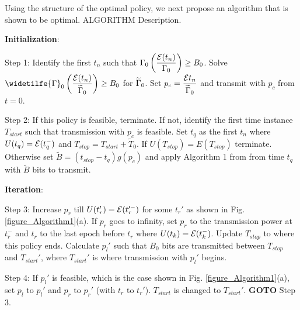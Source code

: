 
%

Using the structure of the optimal policy, we next propose an algorithm that is shown to be optimal. 
ALGORITHM Description.

\textbf{Initialization}:

Step 1: Identify the first $t_n$ such that $\Gamma_0\left(\dfrac{\mathcal{E}(t_n)}{\Gamma_0}\right)\ge B_0$. Solve $\widetilfe{\TRx}_0\left(\dfrac{\ETx(t_n)}{\widetilde{\TRx}_0}\right)\ge B_0$ for $\widetilde{\Gamma}_0$. Set $p_c = \dfrac{\mathcal{E}{t_n}}{\widetilde{\Gamma}_0}$ and transmit with $p_c$ from $t = 0$.

Step 2: If this policy is feasible, terminate. If not, identify the first time instance $T_{start}$ such that transmission with $p_c$ is feasible. Set $t_q$ as the first $t_n$ where $U(t_q) = \mathcal{E}(t_q^-)$ and $T_{stop} = T_{start} + \widetilde{T}_0$. If $U(T_{stop}) = E(T_{stop})$ terminate. Otherwise set $\widetilde{B} = (t_{stop} - t_q)g(p_c)$ and apply Algorithm 1 from \cite{Yang} from time $t_q$ with $\widetilde{B}$ bits to transmit.  

\textbf{Iteration}:

Step 3: Increase $p_r$ till $U(t_r') = \mathcal{E}(t_r'^-)$ for some $t_r'$ as shown in Fig. \ref{figure_Algorithm1}(a). If $p_r$ goes to infinity, set $p_r$ to the transmission power at $t_r^-$ and $t_r$ to the last epoch before $t_r$ where $U(t_k) = \mathcal{E}(t_k^-)$. Update $T_{stop}$ to where this policy ends. Calculate $p_l'$ such that $B_0$ bits are transmitted between $T_{stop}$ and $T_{start}'$, where $T_{start}'$ is where transmission with $p_l'$ begins.

Step 4: If $p_l'$ is feasible, which is the case shown in Fig. \ref{figure_Algorithm1}(a), set $p_l$ to $p_l'$ and $p_r$ to $p_r'$ (with $t_r$ to $t_r'$). $T_{start}$ is changed to $T_{start}'$. \textbf{GOTO} Step 3. 

